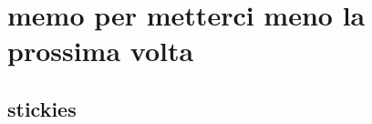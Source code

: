 \documentclass[oneside,21pt,fleqn]{memoir}%
\newcounter{cherrychapter}%
\begin{document}
%
%
%
%
%
%
%

\part{memo per metterci meno la prossima volta}
\chapter{stickies}
\PartialToc
\listofkeywords


%
\end{document}

